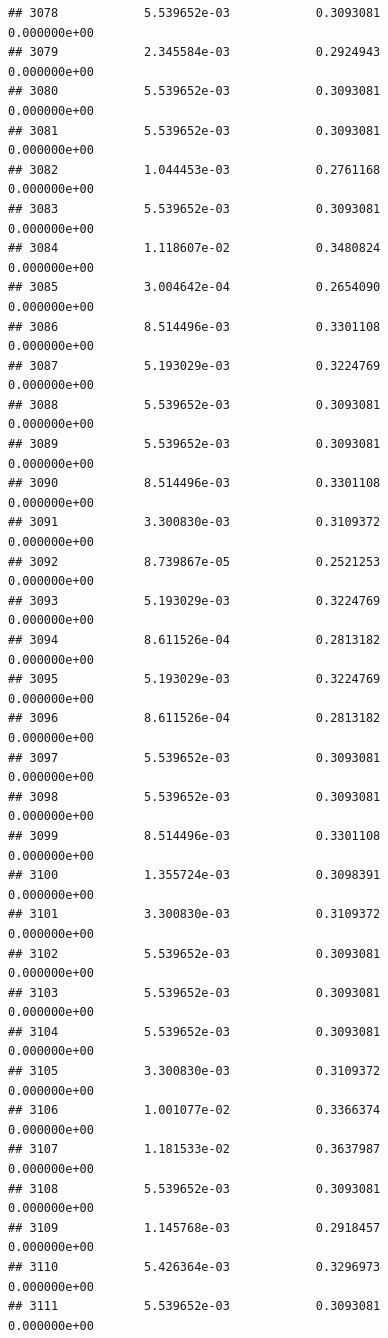 \documentclass[
]{article}
\begin{document}
\begin{verbatim}
## 3078            5.539652e-03            0.3093081            0.000000e+00
## 3079            2.345584e-03            0.2924943            0.000000e+00
## 3080            5.539652e-03            0.3093081            0.000000e+00
## 3081            5.539652e-03            0.3093081            0.000000e+00
## 3082            1.044453e-03            0.2761168            0.000000e+00
## 3083            5.539652e-03            0.3093081            0.000000e+00
## 3084            1.118607e-02            0.3480824            0.000000e+00
## 3085            3.004642e-04            0.2654090            0.000000e+00
## 3086            8.514496e-03            0.3301108            0.000000e+00
## 3087            5.193029e-03            0.3224769            0.000000e+00
## 3088            5.539652e-03            0.3093081            0.000000e+00
## 3089            5.539652e-03            0.3093081            0.000000e+00
## 3090            8.514496e-03            0.3301108            0.000000e+00
## 3091            3.300830e-03            0.3109372            0.000000e+00
## 3092            8.739867e-05            0.2521253            0.000000e+00
## 3093            5.193029e-03            0.3224769            0.000000e+00
## 3094            8.611526e-04            0.2813182            0.000000e+00
## 3095            5.193029e-03            0.3224769            0.000000e+00
## 3096            8.611526e-04            0.2813182            0.000000e+00
## 3097            5.539652e-03            0.3093081            0.000000e+00
## 3098            5.539652e-03            0.3093081            0.000000e+00
## 3099            8.514496e-03            0.3301108            0.000000e+00
## 3100            1.355724e-03            0.3098391            0.000000e+00
## 3101            3.300830e-03            0.3109372            0.000000e+00
## 3102            5.539652e-03            0.3093081            0.000000e+00
## 3103            5.539652e-03            0.3093081            0.000000e+00
## 3104            5.539652e-03            0.3093081            0.000000e+00
## 3105            3.300830e-03            0.3109372            0.000000e+00
## 3106            1.001077e-02            0.3366374            0.000000e+00
## 3107            1.181533e-02            0.3637987            0.000000e+00
## 3108            5.539652e-03            0.3093081            0.000000e+00
## 3109            1.145768e-03            0.2918457            0.000000e+00
## 3110            5.426364e-03            0.3296973            0.000000e+00
## 3111            5.539652e-03            0.3093081            0.000000e+00

\end{verbatim}
\end{document}
